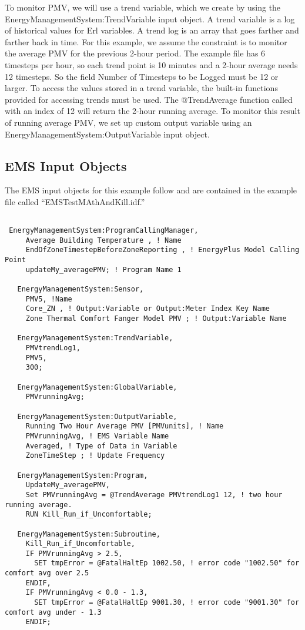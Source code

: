 To monitor PMV, we will use a trend variable, which we create by using the EnergyManagementSystem:TrendVariable input object. A trend variable is a log of historical values for Erl variables. A trend log is an array that goes farther and farther back in time. For this example, we assume the constraint is to monitor the average PMV for the previous 2-hour period. The example file has 6 timesteps per hour, so each trend point is 10 minutes and a 2-hour average needs 12 timesteps. So the field Number of Timesteps to be Logged must be 12 or larger. To access the values stored in a trend variable, the built-in functions provided for accessing trends must be used. The @TrendAverage function called with an index of 12 will return the 2-hour running average. To monitor this result of running average PMV, we set up custom output variable using an EnergyManagementSystem:OutputVariable input object.

\subsection{EMS Input Objects}\label{ems-input-objects-006}

The EMS input objects for this example follow and are contained in the example file called ``EMSTestMAthAndKill.idf.''

\begin{lstlisting}

 EnergyManagementSystem:ProgramCallingManager,
     Average Building Temperature , ! Name
     EndOfZoneTimestepBeforeZoneReporting , ! EnergyPlus Model Calling Point
     updateMy_averagePMV; ! Program Name 1

   EnergyManagementSystem:Sensor,
     PMV5, !Name
     Core_ZN , ! Output:Variable or Output:Meter Index Key Name
     Zone Thermal Comfort Fanger Model PMV ; ! Output:Variable Name

   EnergyManagementSystem:TrendVariable,
     PMVtrendLog1,
     PMV5,
     300;

   EnergyManagementSystem:GlobalVariable,
     PMVrunningAvg;

   EnergyManagementSystem:OutputVariable,
     Running Two Hour Average PMV [PMVunits], ! Name
     PMVrunningAvg, ! EMS Variable Name
     Averaged, ! Type of Data in Variable
     ZoneTimeStep ; ! Update Frequency

   EnergyManagementSystem:Program,
     UpdateMy_averagePMV,
     Set PMVrunningAvg = @TrendAverage PMVtrendLog1 12, ! two hour running average.
     RUN Kill_Run_if_Uncomfortable;

   EnergyManagementSystem:Subroutine,
     Kill_Run_if_Uncomfortable,
     IF PMVrunningAvg > 2.5,
       SET tmpError = @FatalHaltEp 1002.50, ! error code "1002.50" for comfort avg over 2.5
     ENDIF,
     IF PMVrunningAvg < 0.0 - 1.3,
       SET tmpError = @FatalHaltEp 9001.30, ! error code "9001.30" for comfort avg under - 1.3
     ENDIF;
\end{lstlisting}
